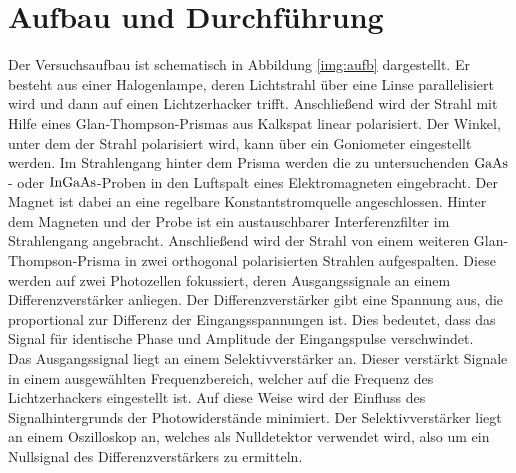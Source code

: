 \section{Aufbau und Durchführung}

  
\noindent
Der Versuchsaufbau ist schematisch in Abbildung \ref{img:aufb} dargestellt. 
Er besteht aus einer Halogenlampe, deren Lichtstrahl über eine Linse parallelisiert wird und dann auf einen Lichtzerhacker trifft.
Anschließend wird der Strahl mit Hilfe eines Glan-Thompson-Prismas aus Kalkspat linear polarisiert. 
Der Winkel, unter dem der Strahl polarisiert wird, kann über ein Goniometer eingestellt werden.
Im Strahlengang hinter dem Prisma werden die zu untersuchenden $\ce{GaAs}$- oder $\ce{InGaAs}$-Proben in den Luftspalt eines Elektromagneten eingebracht.
Der Magnet ist dabei an eine regelbare Konstantstromquelle angeschlossen. 
Hinter dem Magneten und der Probe ist ein austauschbarer Interferenzfilter im Strahlengang angebracht.
Anschließend wird der Strahl von einem weiteren Glan-Thompson-Prisma in zwei orthogonal polarisierten Strahlen aufgespalten. 
Diese werden auf zwei Photozellen fokussiert, deren Ausgangssignale an einem Differenzverstärker anliegen. 
Der Differenzverstärker gibt eine Spannung aus, die proportional zur Differenz der Eingangsspannungen ist. 
Dies bedeutet, dass das Signal für identische Phase und Amplitude der Eingangspulse verschwindet.\\
Das Ausgangssignal liegt an einem Selektivverstärker an. 
Dieser verstärkt Signale in einem ausgewählten Frequenzbereich, welcher auf die Frequenz des Lichtzerhackers eingestellt ist.
Auf diese Weise wird der Einfluss des Signalhintergrunds der Photowiderstände minimiert. 
Der Selektivverstärker liegt an einem Oszilloskop an, welches als Nulldetektor verwendet wird, also um ein Nullsignal des Differenzverstärkers zu ermitteln.\\





